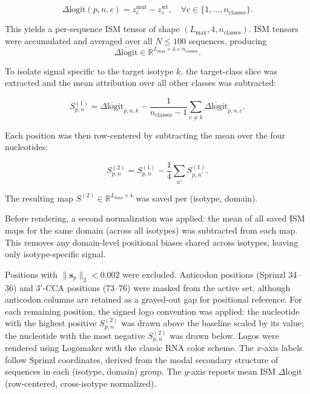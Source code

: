 \documentclass{article}
\begin{document}
\begin{equation}
\Delta \mathrm{logit}(p,n,c) 
= z^{\mathrm{mut}}_{c} - z^{\mathrm{wt}}_{c},
\quad \forall c \in \{1, \ldots, n_{\mathrm{classes}}\}.
\end{equation}

This yields a per-sequence ISM tensor of shape $(L_{\max}, 4, n_{\mathrm{classes}})$. ISM tensors were accumulated and averaged over all $N \leq 100$ sequences, producing
\[
\overline{\Delta \mathrm{logit}} \in \mathbb{R}^{L_{\max} \times 4 \times n_{\mathrm{classes}}}.
\]

To isolate signal specific to the target isotype $k$, the target-class slice was extracted and the mean attribution over all other classes was subtracted:

\begin{equation}
S^{(1)}_{p,n}
= \overline{\Delta \mathrm{logit}}_{p,n,k}
- \frac{1}{n_{\mathrm{classes}} - 1}
\sum_{c \neq k} \overline{\Delta \mathrm{logit}}_{p,n,c}.
\end{equation}

Each position was then row-centered by subtracting the mean over the four nucleotides:

\begin{equation}
S^{(2)}_{p,n}
= S^{(1)}_{p,n}
- \frac{1}{4} \sum_{n'} S^{(1)}_{p,n'}.
\end{equation}

The resulting map $S^{(2)} \in \mathbb{R}^{L_{\max} \times 4}$ was saved per (isotype, domain).

Before rendering, a second normalization was applied: the mean of all saved ISM maps for the same domain (across all isotypes) was subtracted from each map. This removes any domain-level positional biases shared across isotypes, leaving only isotype-specific signal.

Positions with $\lVert \mathbf{s}_p \rVert_2 < 0.002$ were excluded. Anticodon positions (Sprinzl 34--36) and 3$'$-CCA positions (73--76) were masked from the active set, although anticodon columns are retained as a grayed-out gap for positional reference. For each remaining position, the signed logo convention was applied: the nucleotide with the highest positive $S^{(2)}_{p,n}$ was drawn above the baseline scaled by its value; the nucleotide with the most negative $S^{(2)}_{p,n}$ was drawn below. Logos were rendered using Logomaker with the classic RNA color scheme. The $x$-axis labels follow Sprinzl coordinates, derived from the modal secondary structure of sequences in each (isotype, domain) group. The $y$-axis reports mean ISM $\Delta$logit (row-centered, cross-isotype normalized).
\end{document}
